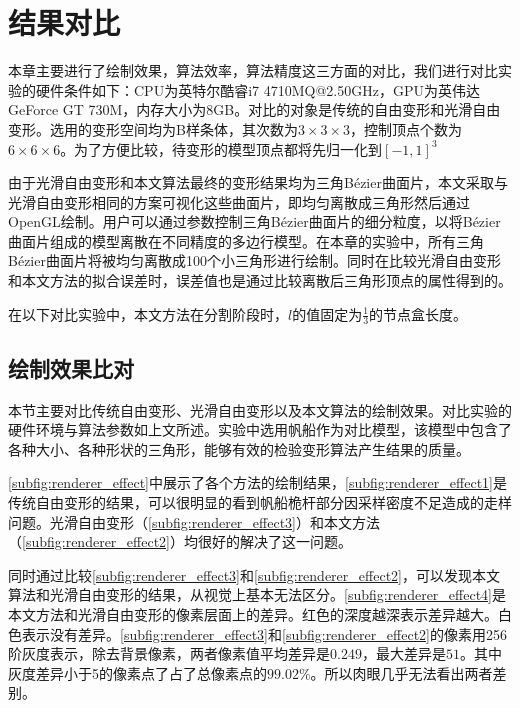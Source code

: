 \chapter{结果对比}
本章主要进行了绘制效果，算法效率，算法精度这三方面的对比，我们进行对比实验的硬件条件如下：CPU为英特尔酷睿i7 4710MQ@2.50GHz，GPU为英伟达GeForce GT 730M，内存大小为8GB。对比的对象是传统的自由变形和光滑自由变形\cite{Cui15}。选用的变形空间均为B样条体，其次数为$3\times3\times3$，控制顶点个数为$6\times6\times6$。为了方便比较，待变形的模型顶点都将先归一化到$[-1, 1]^3$

由于光滑自由变形和本文算法最终的变形结果均为三角Bézier曲面片，本文采取与光滑自由变形相同的方案可视化这些曲面片，即均匀离散成三角形然后通过OpenGL绘制。用户可以通过参数控制三角Bézier曲面片的细分粒度，以将Bézier曲面片组成的模型离散在不同精度的多边行模型。在本章的实验中，所有三角Bézier曲面片将被均匀离散成100个小三角形进行绘制。同时在比较光滑自由变形和本文方法的拟合误差时，误差值也是通过比较离散后三角形顶点的属性得到的。

在以下对比实验中，本文方法在分割阶段时，$l$的值固定为$\frac{1}{3}$的节点盒长度。

\section{绘制效果比对}
本节主要对比传统自由变形、光滑自由变形以及本文算法的绘制效果。对比实验的硬件环境与算法参数如上文所述。实验中选用帆船作为对比模型，该模型中包含了各种大小、各种形状的三角形，能够有效的检验变形算法产生结果的质量。

\autoref{subfig:renderer_effect}中展示了各个方法的绘制结果，\autoref{subfig:renderer_effect1}是传统自由变形的结果，可以很明显的看到帆船桅杆部分因采样密度不足造成的走样问题。光滑自由变形（\autoref{subfig:renderer_effect3}）和本文方法（\autoref{subfig:renderer_effect2}）均很好的解决了这一问题。

同时通过比较\autoref{subfig:renderer_effect3}和\autoref{subfig:renderer_effect2}，可以发现本文算法和光滑自由变形的结果，从视觉上基本无法区分。\autoref{subfig:renderer_effect4}是本文方法和光滑自由变形的像素层面上的差异。红色的深度越深表示差异越大。白色表示没有差异。\autoref{subfig:renderer_effect3}和\autoref{subfig:renderer_effect2}的像素用256阶灰度表示，除去背景像素，两者像素值平均差异是$0.249$，最大差异是$51$。其中灰度差异小于5的像素点了占了总像素点的$99.02\%$。所以肉眼几乎无法看出两者差别。

